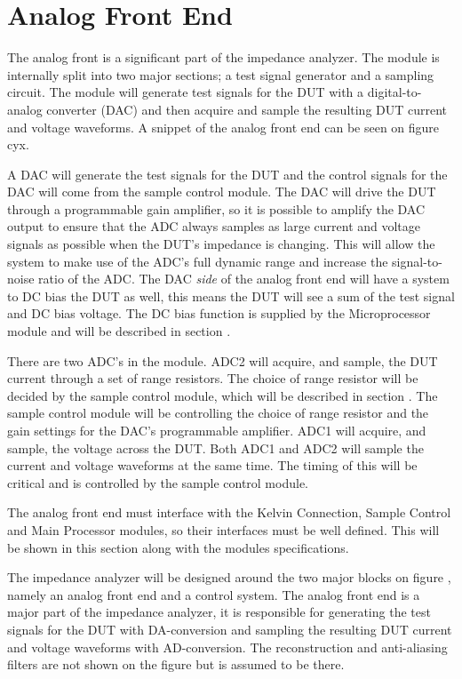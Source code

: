 \section{Analog Front End} \label{sec:AnalogFrontEnd}

The analog front is a significant part of the impedance analyzer. The module is internally split into two major sections; a test signal generator and a sampling circuit. The module will generate test signals for the DUT with a digital-to-analog converter (DAC) and then acquire and sample the resulting DUT current and voltage waveforms. A snippet of the analog front end can be seen on figure cyx.

A DAC will generate the test signals for the DUT and the control signals for the DAC will come from the sample control module. The DAC will drive the DUT through a programmable gain amplifier, so it is possible to amplify the DAC output to ensure that the ADC always samples as large current and voltage signals as possible when the DUT's impedance is changing. This will allow the system to make use of the ADC's full dynamic range and increase the signal-to-noise ratio of the ADC. The DAC \textit{side} of the analog front end will have a system to DC bias the DUT as well, this means the DUT will see a sum of the test signal and DC bias voltage. The DC bias function is supplied by the Microprocessor module and will be described in section .

There are two ADC's in the module. ADC2 will acquire, and sample, the DUT current through a set of range resistors. The choice of range resistor will be decided by the sample control module, which will be described in section . The sample control module will be controlling the choice of range resistor and the gain settings for the DAC's programmable amplifier. ADC1 will acquire, and sample, the voltage across the DUT. Both ADC1 and ADC2 will sample the current and voltage waveforms at the same time. The timing of this will be critical and is controlled by the sample control module.

The analog front end must interface with the Kelvin Connection, Sample Control and Main Processor modules, so their interfaces must be well defined. This will be shown in this section along with the modules specifications.


The impedance analyzer will be designed around the two major blocks on figure , namely an analog front end and a control system. The analog front end is a major part of the impedance analyzer, it is responsible for generating the test signals for the DUT with DA-conversion and sampling the resulting DUT current and voltage waveforms with AD-conversion. The reconstruction and anti-aliasing filters are not shown on the figure but is assumed to be there.

